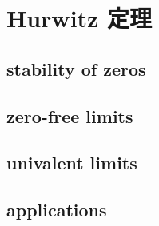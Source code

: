 \section{Hurwitz 定理}
\label{b3:sec:0404}


\subsection{stability of zeros}
\label{b3:subsec:040401}

\subsection{zero-free limits}
\label{b3:subsec:040402}

\subsection{univalent limits}
\label{b3:subsec:040403}

\subsection{applications}
\label{b3:subsec:040404}



